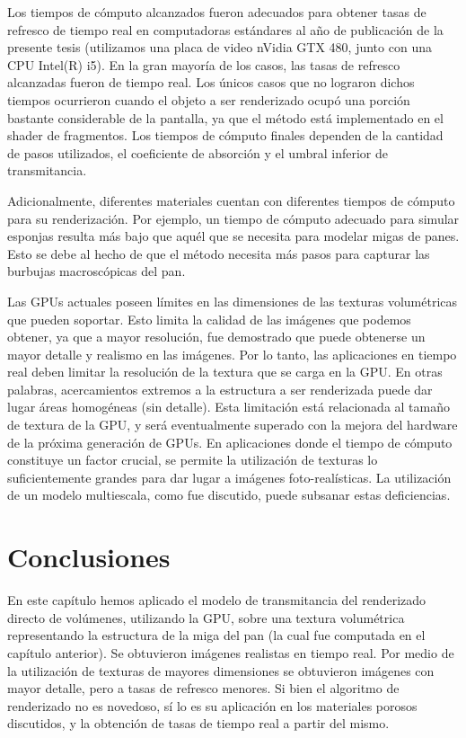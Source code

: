 
Los tiempos de cómputo alcanzados fueron adecuados para obtener tasas de refresco de tiempo real en computadoras estándares al año de publicación de la presente tesis (utilizamos una placa de video nVidia GTX 480, junto con una \acrshort{CPU} Intel(R) i5).
En la gran mayoría de los casos, las tasas de refresco alcanzadas fueron de tiempo real.
Los únicos casos que no lograron dichos tiempos ocurrieron cuando el objeto a ser renderizado ocupó una porción bastante considerable de la pantalla, ya que el método está implementado en el shader de fragmentos.
Los tiempos de cómputo finales dependen de la cantidad de pasos utilizados, el coeficiente de absorción y el umbral inferior de transmitancia.

Adicionalmente, diferentes materiales cuentan con diferentes tiempos de cómputo para su renderización.
Por ejemplo, un tiempo de cómputo adecuado para simular esponjas resulta más bajo que aquél que se necesita para modelar migas de panes.
Esto se debe al hecho de que el método necesita más pasos para capturar las burbujas macroscópicas del pan.

Las GPUs actuales poseen límites en las dimensiones de las texturas volumétricas que pueden soportar.
Esto limita la calidad de las imágenes que podemos obtener, ya que a mayor resolución, fue demostrado que puede obtenerse un mayor detalle y realismo en las imágenes.
Por lo tanto, las aplicaciones en tiempo real deben limitar la resolución de la textura que se carga en la GPU.
En otras palabras, acercamientos extremos a la estructura a ser renderizada puede dar lugar áreas homogéneas (sin detalle).
Esta limitación está relacionada al tamaño de textura de la GPU, y será eventualmente superado con la mejora del hardware de la próxima generación de GPUs.
En aplicaciones donde el tiempo de cómputo constituye un factor crucial, se permite la utilización de texturas lo suficientemente grandes para dar lugar a imágenes foto-realísticas.
La utilización de un modelo multiescala, como fue discutido, puede subsanar estas deficiencias.

\section{Conclusiones}

En este capítulo hemos aplicado el modelo de transmitancia del renderizado directo de volúmenes, utilizando la GPU, sobre una textura volumétrica representando la estructura de la miga del pan (la cual fue computada en el capítulo anterior).
Se obtuvieron imágenes realistas en tiempo real.
Por medio de la utilización de texturas de mayores dimensiones se obtuvieron imágenes con mayor detalle, pero a tasas de refresco menores.
Si bien el algoritmo de renderizado no es novedoso, sí lo es su aplicación en los materiales porosos discutidos, y la obtención de tasas de tiempo real a partir del mismo.

